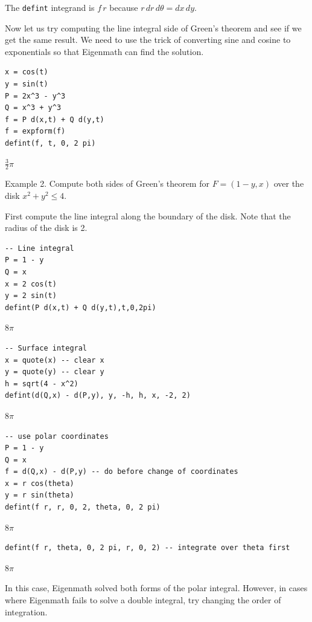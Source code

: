\documentclass[12pt]{article}
\begin{document}
\bigskip
The \verb$defint$ integrand is $f\,r$ because $r\,dr\,d\theta=dx\,dy$.

\bigskip
Now let us try computing the line integral side of Green's theorem
and see if we get the same result.
We need to use the trick of converting sine and cosine to exponentials
so that Eigenmath can find the solution.

{\color{blue}
\begin{verbatim}
x = cos(t)
y = sin(t)
P = 2x^3 - y^3
Q = x^3 + y^3
f = P d(x,t) + Q d(y,t)
f = expform(f)
defint(f, t, 0, 2 pi)
\end{verbatim}
}

$\displaystyle \tfrac{3}{2}\pi$

\bigskip
Example 2.
Compute both sides of Green's theorem for
$F=(1-y,x)$ over the disk $x^2+y^2\le4$.

\bigskip
First compute the line integral along the boundary of the disk.
Note that the radius of the disk is 2.

{\color{blue}
\begin{verbatim}
-- Line integral
P = 1 - y
Q = x
x = 2 cos(t)
y = 2 sin(t)
defint(P d(x,t) + Q d(y,t),t,0,2pi)
\end{verbatim}
}

$\displaystyle 8\pi$

{\color{blue}
\begin{verbatim}
-- Surface integral
x = quote(x) -- clear x
y = quote(y) -- clear y
h = sqrt(4 - x^2)
defint(d(Q,x) - d(P,y), y, -h, h, x, -2, 2)
\end{verbatim}
}

$\displaystyle 8\pi$

{\color{blue}
\begin{verbatim}
-- use polar coordinates
P = 1 - y
Q = x
f = d(Q,x) - d(P,y) -- do before change of coordinates
x = r cos(theta)
y = r sin(theta)
defint(f r, r, 0, 2, theta, 0, 2 pi)
\end{verbatim}
}

$\displaystyle 8\pi$

{\color{blue}
\begin{verbatim}
defint(f r, theta, 0, 2 pi, r, 0, 2) -- integrate over theta first
\end{verbatim}
}

$\displaystyle 8\pi$

\bigskip
In this case, Eigenmath solved both forms of the polar integral.
However, in cases where Eigenmath fails to solve a double integral, try
changing the order of integration.
\end{document}
